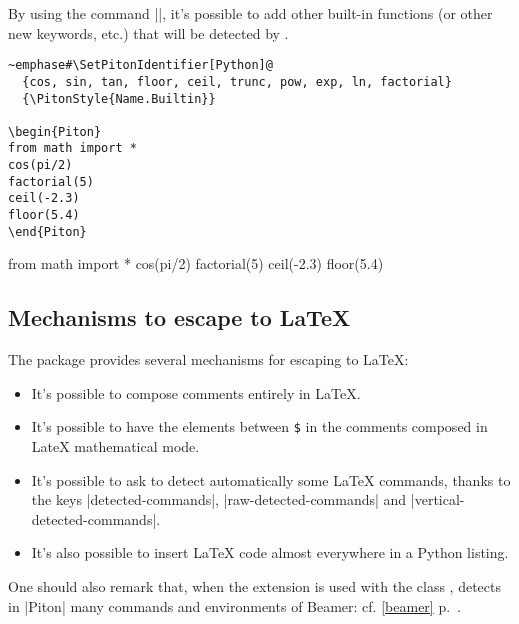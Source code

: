 \documentclass{article}
\begin{document}
\endgroup

\bigskip
By using the command |\SetPitonIdentifier|, it's possible to add other
built-in functions (or other new keywords, etc.) that will be detected by
.


\begin{Verbatim}
~emphase#\SetPitonIdentifier[Python]@
  {cos, sin, tan, floor, ceil, trunc, pow, exp, ln, factorial}
  {\PitonStyle{Name.Builtin}}

\begin{Piton}
from math import *
cos(pi/2) 
factorial(5)
ceil(-2.3) 
floor(5.4) 
\end{Piton}
\end{Verbatim}

\begingroup

  {}

\begin{Piton}
from math import *
cos(pi/2) 
factorial(5)
ceil(-2.3) 
floor(5.4) 
\end{Piton}


\endgroup


\subsection{Mechanisms to escape to LaTeX}

\label{LaTeX-escapes}

The package  provides several mechanisms for escaping to LaTeX:
\begin{itemize}
\item It's possible to compose comments entirely in LaTeX.
\item It's possible to have the elements between \texttt{\$} in the comments
composed in LateX mathematical mode.
\item It's possible to ask  to detect automatically some LaTeX
commands, thanks to the keys |detected-commands|, |raw-detected-commands| and
|vertical-detected-commands|.
\item It's also possible to insert LaTeX code almost everywhere in a Python listing.
\end{itemize}

One should also remark that, when the extension  is used with the
class ,  detects in |{Piton}| many commands and
environments of Beamer: cf. \ref{beamer} p.~\pageref{beamer}.
\end{document}
